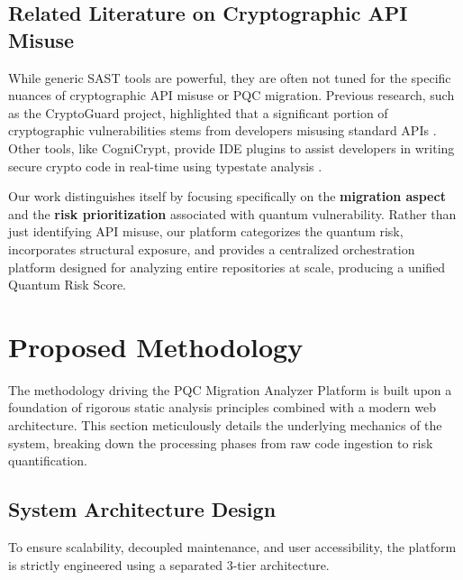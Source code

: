 \documentclass[conference]{IEEEtran}
\begin{document}
\subsection{Related Literature on Cryptographic API Misuse}
While generic SAST tools are powerful, they are often not tuned for the specific nuances of cryptographic API misuse or PQC migration. Previous research, such as the CryptoGuard project, highlighted that a significant portion of cryptographic vulnerabilities stems from developers misusing standard APIs \cite{rahaman2019}. Other tools, like CogniCrypt, provide IDE plugins to assist developers in writing secure crypto code in real-time using typestate analysis \cite{kruger2017}. 

Our work distinguishes itself by focusing specifically on the \textbf{migration aspect} and the \textbf{risk prioritization} associated with quantum vulnerability. Rather than just identifying API misuse, our platform categorizes the quantum risk, incorporates structural exposure, and provides a centralized orchestration platform designed for analyzing entire repositories at scale, producing a unified Quantum Risk Score.

\section{Proposed Methodology}
The methodology driving the PQC Migration Analyzer Platform is built upon a foundation of rigorous static analysis principles combined with a modern web architecture. This section meticulously details the underlying mechanics of the system, breaking down the processing phases from raw code ingestion to risk quantification.

\subsection{System Architecture Design}
To ensure scalability, decoupled maintenance, and user accessibility, the platform is strictly engineered using a separated 3-tier architecture. 
\end{document}
